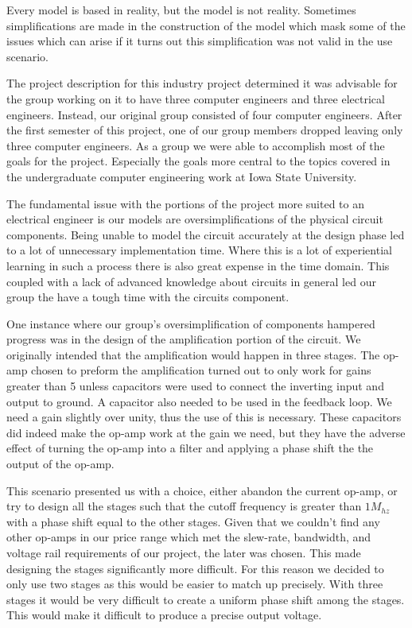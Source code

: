 \documentclass{article}	%
\begin{document}
\begin{multicols}{2}
Every model is based in reality, but
the model is not reality.
Sometimes simplifications are made in
the construction of the model which mask
some of the issues which can arise if 
it turns out this simplification was
not valid in the use scenario.

The project description for this industry project
determined it was advisable for 
the group working on it to have three computer engineers and
three electrical engineers.
Instead, our original group consisted of four computer engineers.
After the first semester of this project,
one of our group members dropped leaving only three computer engineers.
As a group we were able to accomplish most of the goals for the project.
Especially the goals more central to the topics covered in the
undergraduate computer engineering work at Iowa State University.

The fundamental issue with the portions of the project
more suited to an electrical engineer is
our models are oversimplifications of 
the physical circuit components.
Being unable to model the circuit
accurately at the design phase led to
a lot of unnecessary implementation time.
Where this is a lot of experiential learning in
such a process there is also great expense in the time domain.
This coupled with a lack of advanced knowledge about
circuits in general led our group
the have a tough time with the circuits component.

One instance where our group's oversimplification of
components hampered progress was in the design of the
amplification portion of the circuit.
We originally intended that the amplification 
would happen in three stages.
The op-amp chosen to preform the amplification turned
out to only work for gains greater than 5 unless
capacitors were used to connect the inverting input and output to ground.
A capacitor also needed to be used in the feedback loop.
We need a gain slightly over unity,
thus the use of this is necessary.
These capacitors did indeed make the op-amp work at the gain we need, but
they have the adverse effect of turning the op-amp into a filter and
applying a phase shift the the output of the op-amp.

This scenario presented us with a choice,
either abandon the current op-amp, or
try to design all the stages such that 
the cutoff frequency is greater than $1M_{hz}$
with a phase shift equal to the other stages.
Given that we couldn't find any other op-amps 
in our price range which met the slew-rate, bandwidth,
and voltage rail requirements of our project,
the later was chosen.
This made designing the stages significantly more difficult.
For this reason we decided to only use two stages as
this would be easier to match up precisely.
With three stages it would be very difficult to 
create a uniform phase shift among the stages.
This would make it difficult to produce a precise output voltage.


\end{multicols}
\end{document}
